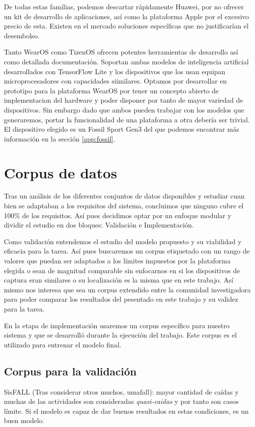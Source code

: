 \documentclass[../tfm.tex]{subfiles}
\begin{document}
De todas estas familias, podemos descartar rápidamente Huawei, por no ofrecer un kit de desarrollo de aplicaciones, así como la plataforma Apple por el excesivo precio de esta. Existen en el mercado soluciones específicas que no justificarían el desembolso.

Tanto WearOS como TizenOS ofrecen potentes herramientas de desarrollo así como detallada documentación. Soportan ambas modelos de inteligencia artificial desarrollados con TensorFlow Lite y los dispositivos que los usan equipan microprocesadores con capacidades siimilares. Optamos por desarrollar en prototipo para la plataforma WearOS por tener un concepto abierto de implementacion del hardware y poder disponer por tanto de mayor variedad de dispositivos. Sin embargo dado que ambos pueden trabajar con los modelos que generaremos, portar la funcionalidad de una plataforma a otra debería ser trivial. El dispositivo elegido es un Fossil Sport Gen3 del que podemos encontrar más información en la sección \ref{app:fossil}.


\section{Corpus de datos}
Tras un análisis de los diferentes conjuntos de datos disponibles y estudiar cuan bien se adaptaban a los requisitos del sistema, concluimos que ninguno cubre el 100\% de los requisitos. Así pues decidimos optar por un enfoque modular y dividir el estudio en dos bloques: Validación e Implementación.

Como validación entendemos el estudio del modelo propuesto y su viabilidad y eficacia para la tarea. Así pues buscaremos un corpus etiquetado con un rango de valores que puedan ser adaptados a los límites impuestos por la plataforma elegida o sean de magnitud comparable sin enfocarnos en si los dispositivos de captura eran similares o su localización es la misma que en este trabajo. Así mismo nos interesa que sea un corpus extendido entre la comunidad investigadora para poder comparar los resultados del pesentado en este trabajo y su validez para la tarea.

En la etapa de implementación usaremos un corpus específico para nuestro sistema y que se desarrolló durante la ejecución del trabajo. Este corpus es el utilizado para entrenar el modelo final.

\subsection{Corpus para la validación}
SisFALL (Tras considerar otros muchos, umafall): mayor cantidad de caídas y muchas de las actividades son consideradas \textit{quasi-caidas} y por tanto son casos límite. Si el modelo es capaz de dar buenos resultados en estas condiciones, es un buen modelo.
\end{document}
